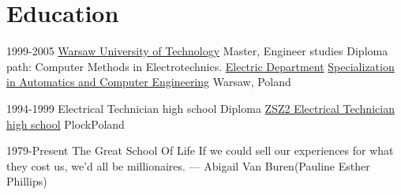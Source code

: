 %
%
%
%


\section{Education}
\cventry
    {1999-2005}
    {\href{http://www.pw.edu.pl}
        {Warsaw University of Technology}}
    {{Master, Engineer studies}
        {Diploma path: Computer Methods in Electrotechnics.}}
    {\href{http://www.ee.pw.edu.pl}
        {Electric Department}}
    {\href{http://www.iem.pw.edu.pl}
        {Specialization in Automatics and Computer Engineering}}
    {Warsaw, Poland}

\cventry
    {1994-1999}
    {Electrical Technician high school Diploma}
    {\href{http://www.zsznr2.pl/}
        {ZSZ2 Electrical Technician high school}}
    {Plock}{Poland}{}

\cventry
    {1979-Present}
    {The Great School Of Life}
    {}{}
    {If we could sell our experiences for what they cost us, we'd all be
    millionaires. --- Abigail Van Buren(Pauline Esther Phillips)}
    {
    }
